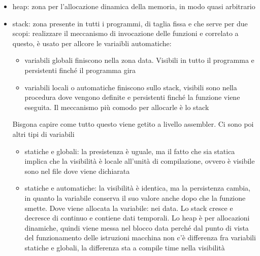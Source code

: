 \documentclass{article}
\begin{document}
\begin{itemize}
\item heap: zona per l'allocazione dinamica della memoria, in modo quasi arbitrario
\item stack: zona presente in tutti i programmi, di taglia fissa e che serve per due scopi: realizzare il meccanismo di invocazione delle funzioni e correlato a questo, è usato per allcore le variaibli automatiche:
\begin{itemize}
\item variabili globali finiscono nella zona data. Visibili in tutto il programma e persistenti finché il programma gira
\item variabili locali o automatiche finiscono sullo stack, visibili sono nella procedura dove vengono definite e persistenti finché la funzione viene eseguita. Il meccanismo più comodo per allocarle è lo stack
\end{itemize}
Bisgona capire come tutto questo viene getito a livello assembler. Ci sono poi altri tipi di variabili
\begin{itemize}
\item statiche e globali: la presistenza è uguale, ma il fatto che sia statica implica che la visibilità è locale all'unità di compilazione, ovvero è visibile sono nel file dove viene dichiarata
\item statiche e automatiche: la visibilità è identica, ma la persistenza cambia, in quanto la variabile conserva il suo valore anche dopo che la funzione smette. Dove viene allocata la variabile: nei data. Lo stack cresce e decresce di continuo e contiene dati temporali. Lo heap è per allocazioni dinamiche, quindi viene messa nel blocco data perché dal punto di vista del funzionamento delle istruzioni macchina non c'è differenza fra variabili statiche e globali, la differenza sta a compile time nella visibilità 
\end{itemize}
\end{itemize}
\end{document}
